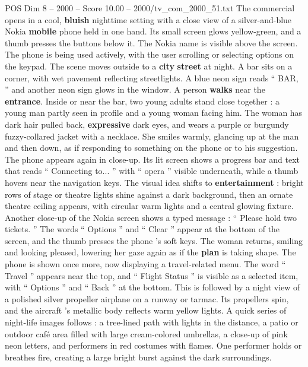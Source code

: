 \begin{textsample}{POS Dim 8 – 2000 – Score 10.00 – 2000/tv\_com\_2000\_51.txt}  \label{ex:f8_pos_005}
The commercial opens in a cool, \textbf{bluish} nighttime setting with a close view of a silver-and-blue Nokia \textbf{mobile} phone held in one hand.
Its small screen glows yellow-green, and a thumb presses the buttons below it.
The Nokia name is visible above the screen.
The phone is being used actively, with the user scrolling or selecting options on the keypad.
The scene moves outside to a \textbf{city} \textbf{street} at night.
A bar sits on a corner, with wet pavement reflecting streetlights.
A blue neon sign reads “ BAR, ” and another neon sign glows in the window.
A person \textbf{walks} near the \textbf{entrance}.
Inside or near the bar, two young adults stand close together : a young man partly seen in profile and a young woman facing him.
The woman has dark hair pulled back, \textbf{expressive} dark eyes, and wears a purple or burgundy fuzzy-collared jacket with a necklace.
She smiles warmly, glancing up at the man and then down, as if responding to something on the phone or to his suggestion.
The phone appears again in close-up.
Its lit screen shows a progress bar and text that reads “ Connecting to... ” with “ opera ” visible underneath, while a thumb hovers near the navigation keys.
The visual idea shifts to \textbf{entertainment} : bright rows of stage or theatre lights shine against a dark background, then an ornate theatre ceiling appears, with circular warm lights and a central glowing fixture.
Another close-up of the Nokia screen shows a typed message : “ Please hold two tickets. ” The words “ Options ” and “ Clear ” appear at the bottom of the screen, and the thumb presses the phone ’s soft keys.
The woman returns, smiling and looking pleased, lowering her gaze again as if the \textbf{plan} is taking shape.
The phone is shown once more, now displaying a travel-related menu.
The word “ Travel ” appears near the top, and “ Flight Status ” is visible as a selected item, with “ Options ” and “ Back ” at the bottom.
This is followed by a night view of a polished silver propeller airplane on a runway or tarmac.
Its propellers spin, and the aircraft ’s metallic body reflects warm yellow lights.
A quick series of night-life images follows : a tree-lined path with lights in the distance, a patio or outdoor café area filled with large cream-colored umbrellas, a close-up of pink neon letters, and performers in red costumes with flames.
One performer holds or breathes fire, creating a large bright burst against the dark surroundings.

\end{textsample}
